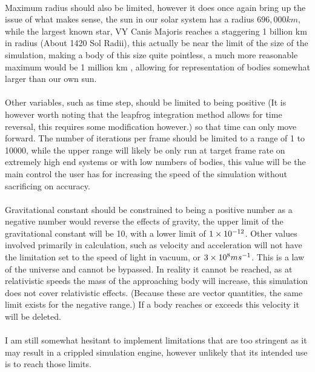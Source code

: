 \paragraph{}
Maximum radius should also be limited, however it does once again bring up the issue of what makes sense, the sun in our solar system has a radius $696,000 km$, while the largest known star, VY Canis Majoris reaches a staggering 1 billion km in radius (About 1420 Sol Radii), this actually be near the limit of the size of the simulation, making a body of this size quite pointless, a much more reasonable maximum would be 1 million km , allowing for representation of bodies somewhat larger than our own sun.

\paragraph{}
Other variables, such as time step, should be limited to being positive (It is however worth noting that the leapfrog integration method allows for time reversal, this requires some modification however.) so that time can only move forward. The number of iterations per frame should be limited to a range of 1 to 10000, while the upper range will likely be only run at target frame rate on extremely high end systems or with low numbers of bodies, this value will be the main control the user has for increasing the speed of the simulation without sacrificing on accuracy.

\paragraph{}
Gravitational constant should be constrained to being a positive number as a negative number would reverse the effects of gravity, the upper limit of the gravitational constant will be 10, with a lower limit of $\num{1E-12}$.
Other values involved primarily in calculation, such as velocity and acceleration will not have the limitation set to the speed of light in vacuum, or $\num{3E8} ms^{-1}$. This is a law of the universe and cannot be bypassed. In reality it cannot be reached, as at relativistic speeds the mass of the approaching body will increase, this simulation does not cover relativistic effects. (Because these are vector quantities, the same limit exists for the negative range.) If a body reaches or exceeds this velocity it will be deleted.

\paragraph{}
I am still somewhat hesitant to implement limitations that are too stringent as it may result in a crippled simulation engine, however unlikely that its intended use is to reach those limits.

